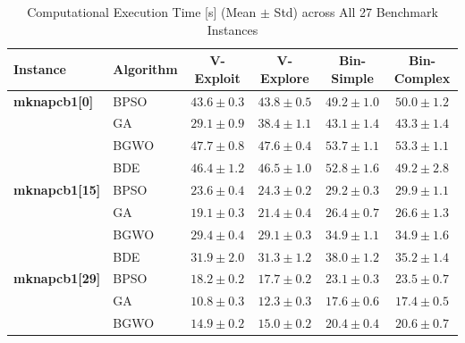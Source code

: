 \begin{table}[htbp]
  \centering
  \small
  \caption{Computational Execution Time [s] (Mean $\pm$ Std) across All 27 Benchmark Instances}
  \label{tab:computational_cost_all_instances}
  \begin{tabular*}{\textwidth}{@{\extracolsep{\fill}}llcccc@{}}
    \toprule
    \textbf{Instance} & \textbf{Algorithm} & \textbf{V-Exploit} & \textbf{V-Explore} & \textbf{Bin-Simple} & \textbf{Bin-Complex} \\
    \midrule
    \textbf{mknapcb1[0]} & BPSO  &  $\mathbf{43.6 \pm 0.3}$ &           $43.8 \pm 0.5$ &           $49.2 \pm 1.0$ &           $50.0 \pm 1.2$ \\
                       & GA    &  $\mathbf{29.1 \pm 0.9}$ &           $38.4 \pm 1.1$ &           $43.1 \pm 1.4$ &           $43.3 \pm 1.4$ \\
                       & BGWO  &           $47.7 \pm 0.8$ &  $\mathbf{47.6 \pm 0.4}$ &           $53.7 \pm 1.1$ &           $53.3 \pm 1.1$ \\
                       & BDE   &  $\mathbf{46.4 \pm 1.2}$ &           $46.5 \pm 1.0$ &           $52.8 \pm 1.6$ &           $49.2 \pm 2.8$ \\
    \midrule
    \textbf{mknapcb1[15]} & BPSO  &  $\mathbf{23.6 \pm 0.4}$ &           $24.3 \pm 0.2$ &           $29.2 \pm 0.3$ &           $29.9 \pm 1.1$ \\
                       & GA    &  $\mathbf{19.1 \pm 0.3}$ &           $21.4 \pm 0.4$ &           $26.4 \pm 0.7$ &           $26.6 \pm 1.3$ \\
                       & BGWO  &           $29.4 \pm 0.4$ &  $\mathbf{29.1 \pm 0.3}$ &           $34.9 \pm 1.1$ &           $34.9 \pm 1.6$ \\
                       & BDE   &           $31.9 \pm 2.0$ &  $\mathbf{31.3 \pm 1.2}$ &           $38.0 \pm 1.2$ &           $35.2 \pm 1.4$ \\
    \midrule
    \textbf{mknapcb1[29]} & BPSO  &           $18.2 \pm 0.2$ &  $\mathbf{17.7 \pm 0.2}$ &           $23.1 \pm 0.3$ &           $23.5 \pm 0.7$ \\
                       & GA    &  $\mathbf{10.8 \pm 0.3}$ &           $12.3 \pm 0.3$ &           $17.6 \pm 0.6$ &           $17.4 \pm 0.5$ \\
                       & BGWO  &  $\mathbf{14.9 \pm 0.2}$ &           $15.0 \pm 0.2$ &           $20.4 \pm 0.4$ &           $20.6 \pm 0.7$ \\

\end{tabular*}
\end{table}
